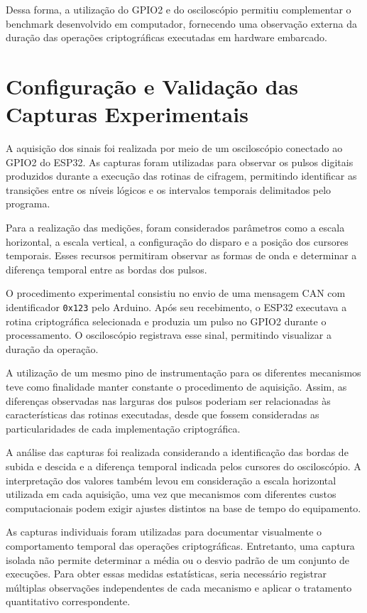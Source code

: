 Dessa forma, a utilização do GPIO2 e do osciloscópio permitiu complementar o benchmark desenvolvido em computador, fornecendo uma observação externa da duração das operações criptográficas executadas em hardware embarcado.

\section{Configuração e Validação das Capturas Experimentais}

A aquisição dos sinais foi realizada por meio de um osciloscópio conectado ao GPIO2 do ESP32. As capturas foram utilizadas para observar os pulsos digitais produzidos durante a execução das rotinas de cifragem, permitindo identificar as transições entre os níveis lógicos e os intervalos temporais delimitados pelo programa.

Para a realização das medições, foram considerados parâmetros como a escala horizontal, a escala vertical, a configuração do disparo e a posição dos cursores temporais. Esses recursos permitiram observar as formas de onda e determinar a diferença temporal entre as bordas dos pulsos.

O procedimento experimental consistiu no envio de uma mensagem CAN com identificador \texttt{0x123} pelo Arduino. Após seu recebimento, o ESP32 executava a rotina criptográfica selecionada e produzia um pulso no GPIO2 durante o processamento. O osciloscópio registrava esse sinal, permitindo visualizar a duração da operação.

A utilização de um mesmo pino de instrumentação para os diferentes mecanismos teve como finalidade manter constante o procedimento de aquisição. Assim, as diferenças observadas nas larguras dos pulsos poderiam ser relacionadas às características das rotinas executadas, desde que fossem consideradas as particularidades de cada implementação criptográfica.

A análise das capturas foi realizada considerando a identificação das bordas de subida e descida e a diferença temporal indicada pelos cursores do osciloscópio. A interpretação dos valores também levou em consideração a escala horizontal utilizada em cada aquisição, uma vez que mecanismos com diferentes custos computacionais podem exigir ajustes distintos na base de tempo do equipamento.

As capturas individuais foram utilizadas para documentar visualmente o comportamento temporal das operações criptográficas. Entretanto, uma captura isolada não permite determinar a média ou o desvio padrão de um conjunto de execuções. Para obter essas medidas estatísticas, seria necessário registrar múltiplas observações independentes de cada mecanismo e aplicar o tratamento quantitativo correspondente.

